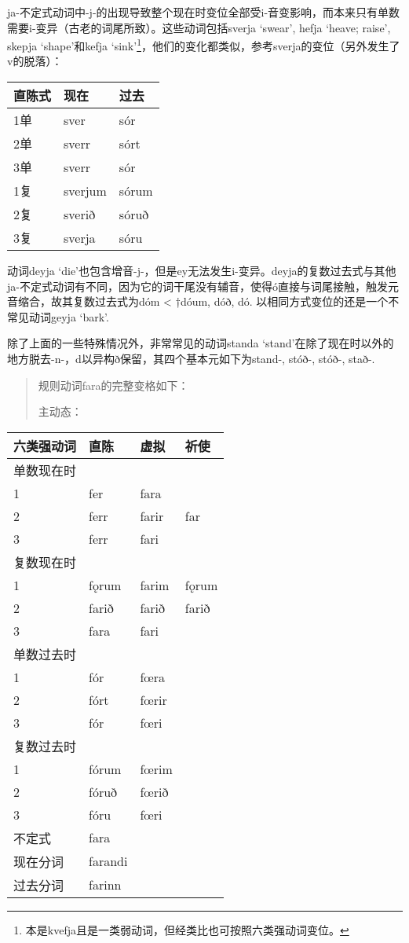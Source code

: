 ja-不定式动词中-j-的出现导致整个现在时变位全部受i-音变影响，而本来只有单数需要i-变异（古老的词尾所致）。这些动词包括sverja
`swear', hefja `heave; raise', skepja `shape'和kefja
`sink'\footnote{本是kvefja且是一类弱动词，但经类比也可按照六类强动词变位。}，他们的变化都类似，参考sverja的变位（另外发生了v的脱落）：

\begin{longtable}{lll}
\toprule
直陈式 & 现在 & 过去 \\
\midrule
\endhead
\bottomrule
\endfoot
1单 & sver & sór \\
2单 & sverr & sórt \\
3单 & sverr & sór \\
1复 & sverjum & sórum \\
2复 & sverið & sóruð \\
3复 & sverja & sóru \\
\end{longtable}

动词deyja
`die'也包含增音-j-，但是ey无法发生i-变异。deyja的复数过去式与其他ja-不定式动词有不同，因为它的词干尾没有辅音，使得ó直接与词尾接触，触发元音缩合，故其复数过去式为dóm
\textless{} †dóum, dóð, dó. 以相同方式变位的还是一个不常见动词geyja
`bark'.

除了上面的一些特殊情况外，非常常见的动词standa
`stand‌'在除了现在时以外的地方脱去-n-，d以异构ð保留，其四个基本元如下为stand-,
stóð-, stóð-, stað-.

\begin{quote}
规则动词fara的完整变格如下：

主动态：
\end{quote}

\begin{longtable}{llll}
\toprule
六类强动词 & 直陈 & 虚拟 & 祈使 \\
\midrule
\endhead
\bottomrule
\endfoot
单数现在时 & & & \\
1 & fer & fara & \\
2 & ferr & farir & far \\
3 & ferr & fari & \\
复数现在时 & & & \\
1 & fǫrum & farim & fǫrum \\
2 & farið & farið & farið \\
3 & fara & fari & \\
单数过去时 & & & \\
1 & fór & fœra & \\
2 & fórt & fœrir & \\
3 & fór & fœri & \\
复数过去时 & & & \\
1 & fórum & fœrim & \\
2 & fóruð & fœrið & \\
3 & fóru & fœri & \\
不定式 & fara & & \\
现在分词 & farandi & & \\
过去分词 & farinn & & \\
\end{longtable}

